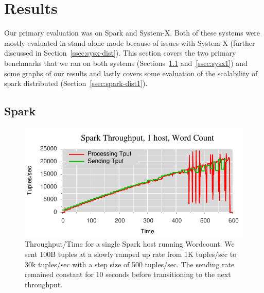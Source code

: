 \section{Results}

Our primary evaluation was on Spark and System-X. Both of these systems were
mostly evaluated in stand-alone mode because of issues with System-X (further
discussed in Section~\ref{ssec:sysx-dist}). This section covers the two primary
benchmarks that we ran on both systems (Sections~\ref{ssec:spark1}
and~\ref{ssec:sysx1}) and some graphs of our results and lastly covers some
evaluation of the scalability of spark distributed
(Section~\ref{ssec:spark-dist1}).

\subsection{Spark}
\label{ssec:spark1}

\begin{figure}[b]
\centering
\includegraphics[width=1\linewidth]{figures/sp1_tput.pdf}
\caption{Throughput/Time for a single Spark host running Wordcount. We sent 100B tuples at a
slowly ramped up rate from 1K tuples/sec to 30k tuples/sec with a step size of
500 tuples/sec. The sending rate remained constant for 10 seconds before
transitioning to the next throughput.}
\label{fig:sp1-tput}
\end{figure}

